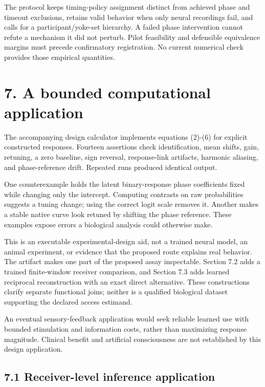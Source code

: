 \documentclass[
  american,
  11pt,
  letterpaper,
]{article}
\begin{document}
The protocol keeps timing-policy assignment distinct from achieved phase and timeout exclusions, retains valid behavior when only neural recordings fail, and calls for a participant/yoke-set hierarchy. A failed phase intervention cannot refute a mechanism it did not perturb. Pilot feasibility and defensible equivalence margins must precede confirmatory registration. No current numerical check provides those empirical quantities.

\section{7. A bounded computational application}\label{a-bounded-computational-application}

The accompanying design calculator implements equations (2)-(6) for explicit constructed responses. Fourteen assertions check identification, mean shifts, gain, retuning, a zero baseline, sign reversal, response-link artifacts, harmonic aliasing, and phase-reference drift. Repeated runs produced identical output.

One counterexample holds the latent binary-response phase coefficients fixed while changing only the intercept. Computing contrasts on raw probabilities suggests a tuning change; using the correct logit scale removes it. Another makes a stable native curve look retuned by shifting the phase reference. These examples expose errors a biological analysis could otherwise make.

This is an executable experimental-design aid, not a trained neural model, an animal experiment, or evidence that the proposed route explains real behavior. The artifact makes one part of the proposed assay inspectable. Section 7.2 adds a trained finite-window receiver comparison, and Section 7.3 adds learned reciprocal reconstruction with an exact direct alternative. These constructions clarify separate functional joins; neither is a qualified biological dataset supporting the declared access estimand.

An eventual sensory-feedback application would seek reliable learned use with bounded stimulation and information costs, rather than maximizing response magnitude. Clinical benefit and artificial consciousness are not established by this design application.

\subsection{7.1 Receiver-level inference application}\label{receiver-level-inference-application}
\end{document}
